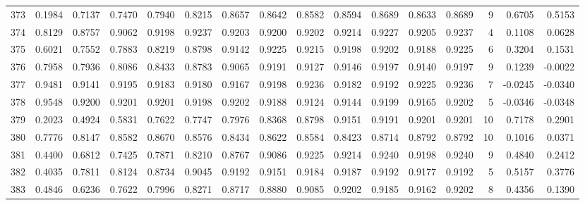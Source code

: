 \begin{tabular}{lrrrrrrrrrrrrrrr}
373 &      0.1984 &  0.7137 &  0.7470 &  0.7940 &  0.8215 &  0.8657 &  0.8642 &  0.8582 &  0.8594 &  0.8689 &   0.8633 &     0.8689 &      9 &                    0.6705 &                     0.5153 \\
374 &      0.8129 &  0.8757 &  0.9062 &  0.9198 &  0.9237 &  0.9203 &  0.9200 &  0.9202 &  0.9214 &  0.9227 &   0.9205 &     0.9237 &      4 &                    0.1108 &                     0.0628 \\
375 &      0.6021 &  0.7552 &  0.7883 &  0.8219 &  0.8798 &  0.9142 &  0.9225 &  0.9215 &  0.9198 &  0.9202 &   0.9188 &     0.9225 &      6 &                    0.3204 &                     0.1531 \\
376 &      0.7958 &  0.7936 &  0.8086 &  0.8433 &  0.8783 &  0.9065 &  0.9191 &  0.9127 &  0.9146 &  0.9197 &   0.9140 &     0.9197 &      9 &                    0.1239 &                    -0.0022 \\
377 &      0.9481 &  0.9141 &  0.9195 &  0.9183 &  0.9180 &  0.9167 &  0.9198 &  0.9236 &  0.9182 &  0.9192 &   0.9225 &     0.9236 &      7 &                   -0.0245 &                    -0.0340 \\
378 &      0.9548 &  0.9200 &  0.9201 &  0.9201 &  0.9198 &  0.9202 &  0.9188 &  0.9124 &  0.9144 &  0.9199 &   0.9165 &     0.9202 &      5 &                   -0.0346 &                    -0.0348 \\
379 &      0.2023 &  0.4924 &  0.5831 &  0.7622 &  0.7747 &  0.7976 &  0.8368 &  0.8798 &  0.9151 &  0.9191 &   0.9201 &     0.9201 &     10 &                    0.7178 &                     0.2901 \\
380 &      0.7776 &  0.8147 &  0.8582 &  0.8670 &  0.8576 &  0.8434 &  0.8622 &  0.8584 &  0.8423 &  0.8714 &   0.8792 &     0.8792 &     10 &                    0.1016 &                     0.0371 \\
381 &      0.4400 &  0.6812 &  0.7425 &  0.7871 &  0.8210 &  0.8767 &  0.9086 &  0.9225 &  0.9214 &  0.9240 &   0.9198 &     0.9240 &      9 &                    0.4840 &                     0.2412 \\
382 &      0.4035 &  0.7811 &  0.8124 &  0.8734 &  0.9045 &  0.9192 &  0.9151 &  0.9184 &  0.9187 &  0.9192 &   0.9177 &     0.9192 &      5 &                    0.5157 &                     0.3776 \\
383 &      0.4846 &  0.6236 &  0.7622 &  0.7996 &  0.8271 &  0.8717 &  0.8880 &  0.9085 &  0.9202 &  0.9185 &   0.9162 &     0.9202 &      8 &                    0.4356 &                     0.1390 \\

\end{tabular}
